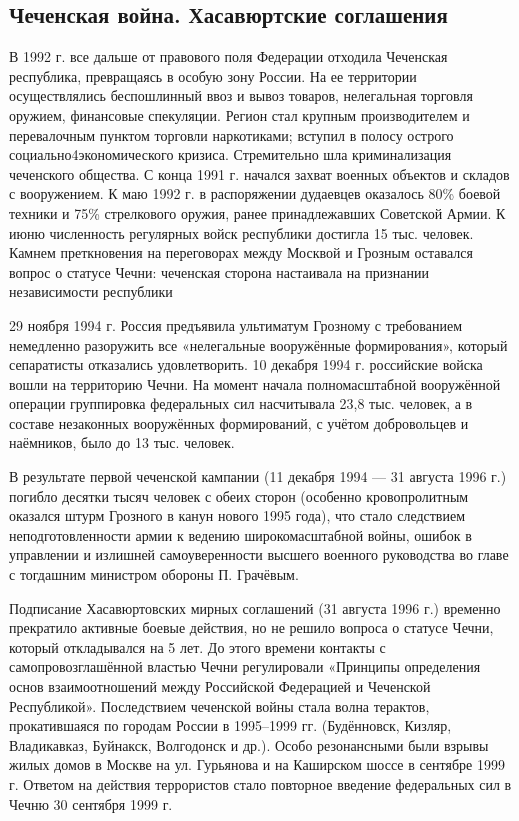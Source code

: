 \subsection{Чеченская война. Хасавюртские соглашения}
В 1992 г. все дальше от правового поля Федерации отходила Чеченская республика, превращаясь в особую зону России. На ее территории осуществлялись беспошлинный ввоз и вывоз товаров, нелегальная торговля оружием, финансовые спекуляции. Регион стал крупным производителем и перевалочным пунктом торговли наркотиками; вступил в полосу острого социально4экономического кризиса. Стремительно шла криминализация чеченского общества. С конца 1991 г. начался захват военных объектов и складов с вооружением. К маю 1992 г. в распоряжении дудаевцев оказалось 80\% боевой техники и 75\% стрелкового оружия, ранее принадлежавших Советской Армии. К июню численность регулярных войск республики достигла 15 тыс. человек. Камнем преткновения на переговорах между Москвой и Грозным оставался вопрос о статусе Чечни: чеченская сторона настаивала на признании независимости республики

29 ноября 1994 г. Россия предъявила ультиматум Грозному с требованием немедленно разоружить все «нелегальные вооружённые формирования», который сепаратисты отказались удовлетворить. 10 декабря 1994 г. российские войска вошли на территорию Чечни. На момент начала полномасштабной вооружённой операции группировка федеральных сил насчитывала 23,8 тыс. человек, а в составе незаконных вооружённых формирований, с учётом добровольцев и наёмников, было до 13 тыс. человек.

В результате первой чеченской кампании (11 декабря 1994 — 31 августа 1996 г.) погибло десятки тысяч человек с обеих сторон (особенно кровопролитным оказался штурм Грозного в канун нового 1995 года), что стало следствием неподготовленности армии к ведению широкомасштабной войны, ошибок в управлении и излишней самоуверенности высшего военного руководства во главе с тогдашним министром обороны П. Грачёвым. 

Подписание Хасавюртовских мирных соглашений (31 августа 1996 г.) временно прекратило активные боевые действия, но не решило вопроса о статусе Чечни, который откладывался на 5 лет. До этого времени контакты с самопровозглашённой властью Чечни регулировали «Принципы определения основ взаимоотношений между Российской Федерацией и Чеченской Республикой». Последствием чеченской войны стала волна терактов, прокатившаяся по городам России в 1995–1999 гг. (Будённовск, Кизляр, Владикавказ, Буйнакск, Волгодонск и др.). Особо резонансными были взрывы жилых домов в Москве на ул. Гурьянова и на Каширском шоссе в сентябре 1999 г. Ответом на действия террористов стало повторное введение федеральных сил в Чечню 30 сентября 1999 г.


